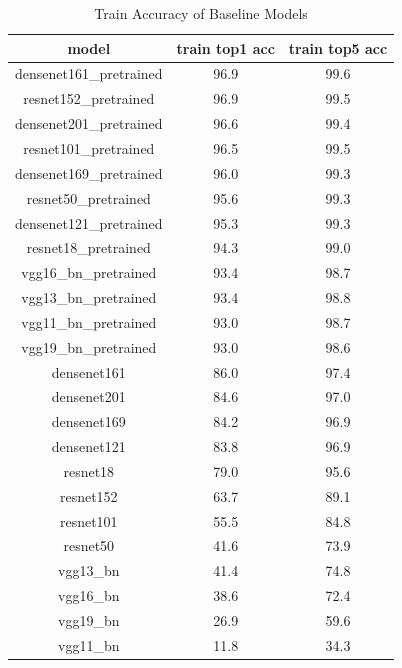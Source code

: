 \begin{table}
  \centering
  \caption{Train Accuracy of Baseline Models}
  \label{tabel:train_acc}
  \begin{tabular}{ccc}
    \hline
    \toprule
    model                   & train top1 acc     & train top5 acc     \\
    \midrule  %
    densenet161\_pretrained & 96.9 & 99.6 \\
    resnet152\_pretrained   & 96.9 & 99.5 \\
    densenet201\_pretrained & 96.6 & 99.4 \\
    resnet101\_pretrained   & 96.5 & 99.5 \\
    densenet169\_pretrained & 96.0 & 99.3 \\
    resnet50\_pretrained    & 95.6 & 99.3 \\
    densenet121\_pretrained & 95.3 & 99.3 \\
    resnet18\_pretrained    & 94.3 & 99.0 \\
    vgg16\_bn\_pretrained   & 93.4 & 98.7 \\
    vgg13\_bn\_pretrained   & 93.4 & 98.8 \\
    vgg11\_bn\_pretrained   & 93.0 & 98.7 \\
    vgg19\_bn\_pretrained   & 93.0 & 98.6 \\
    densenet161             & 86.0 & 97.4 \\
    densenet201             & 84.6 & 97.0 \\
    densenet169             & 84.2 & 96.9 \\
    densenet121             & 83.8 & 96.9 \\
    resnet18                & 79.0 & 95.6 \\
    resnet152               & 63.7 & 89.1 \\
    resnet101               & 55.5 & 84.8 \\
    resnet50                & 41.6 & 73.9 \\
    vgg13\_bn               & 41.4 & 74.8 \\
    vgg16\_bn               & 38.6 & 72.4 \\
    vgg19\_bn               & 26.9 & 59.6 \\
    vgg11\_bn               & 11.8 & 34.3 \\
    \bottomrule
  \end{tabular}
\end{table}


